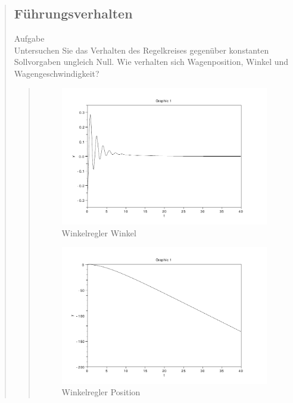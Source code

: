 \begin{quote}
    \subsection{Führungsverhalten}
    Aufgabe\\
    Untersuchen Sie das Verhalten des Regelkreises gegenüber konstanten Sollvorgaben ungleich Null. Wie verhalten sich
    Wagenposition, Winkel und Wagengeschwindigkeit?
    
    \begin{quote}
    
        
        
        \begin{figure}[H]
        \centering
            \includegraphics[scale=0.7, trim = 0cm 0cm 0cm 0cm, clip]{./Bilder/Winkelregler_Winkel}
                \caption{Winkelregler Winkel}
        \end{figure}
    
        \begin{figure}[H]
        \centering
            \includegraphics[scale=0.7, trim = 0cm 0cm 0cm 0cm, clip]{./Bilder/Winkelregler_Position}
                \caption{Winkelregler Position}
        \end{figure}
        

\end{quote}
\end{quote}
